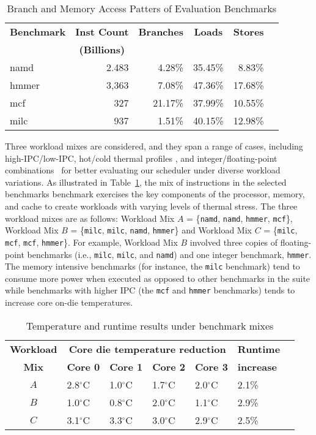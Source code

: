 \begin{table}[t]
  \centering
  \caption{Branch and Memory Access Patters of Evaluation Benchmarks}
  \label{tab:mixstats}
\begin{tabular}{lrrrrr}
\hline
\multicolumn{1}{l}{\textbf{Benchmark}}& \multicolumn{1}{c}{\textbf{Inst Count}} & \multicolumn{1}{c}{\textbf{Branches}}&\multicolumn{1}{c}{\textbf{Loads}} & \multicolumn{1}{c}{\textbf{Stores}} \\
 & \multicolumn{1}{c}{\textbf{(Billions)}}&  &  &  \\
\hline
namd & 2.483 & 4.28\% & 35.45\% & 8.83\% \\
hmmer & 3,363 & 7.08\% & 47.36\% & 17.68\% \\
mcf & 327 & 21.17\% & 37.99\% & 10.55\% \\
milc & 937 & 1.51\% & 40.15\% & 12.98\% \\
\hline
\end{tabular}
\end{table}
Three workload mixes are considered, and they span a range of cases,
including high-IPC/low-IPC, hot/cold thermal profiles \cite{Kursun2008},
and integer/floating-point combinations~\cite{Phansalkar2007} for better
evaluating our scheduler under diverse workload variations.  As
illustrated in Table~\ref{tab:mixstats}, the mix of instructions in the
selected benchmarks benchmark exercises the key components of the
processor, memory, and cache to create workloads with varying levels of
thermal stress. The three workload mixes are as follows: Workload Mix
$A$ = \{\texttt{namd}, \texttt{namd}, \texttt{hmmer}, \texttt{mcf}\},
Workload Mix $B$ = \{\texttt{milc}, \texttt{milc}, \texttt{namd},
\texttt{hmmer}\} and Workload Mix $C$ = \{\texttt{milc}, \texttt{mcf},
\texttt{mcf}, \texttt{hmmer}\}.  For example, Workload Mix $B$ involved
three copies of floating-point benchmarks (i.e., \texttt{milc},
\texttt{milc}, and \texttt{namd}) and one integer benchmark,
\texttt{hmmer}.  The memory intensive benchmarks (for instance, the
\texttt{milc} benchmark) tend to consume more power when executed as
opposed to other benchmarks in the suite while benchmarks with higher
IPC (the \texttt{mcf} and \texttt{hmmer} benchmarks) tends to increase
core on-die temperatures.

\begin{table}[tbp] 
\centering
\caption{Temperature and runtime results under benchmark mixes}
\label{tab:mixwkload}
\begin{tabular}{cllllll} 
\hline
\hline
\textbf{Workload} & \multicolumn{4}{c}{\textbf{Core die temperature reduction}} & \textbf{Runtime}\\
 \textbf{Mix} & \textbf{Core 0} & \textbf{Core 1} & \textbf{Core 2}  & \textbf{Core 3} & \textbf{increase} \\
\hline
$A$ & 2.8$^{\circ}$C & 1.0$^{\circ}$C & 1.7$^{\circ}$C & 2.0$^{\circ}$C & 2.1\% \\
$B$ & 1.0$^{\circ}$C & 0.8$^{\circ}$C & 2.0$^{\circ}$C & 1.1$^{\circ}$C & 2.9\% \\
$C$ & 3.1$^{\circ}$C & 3.3$^{\circ}$C & 3.0$^{\circ}$C & 2.9$^{\circ}$C & 2.5\% \\
\hline
\end{tabular}
\end{table}

